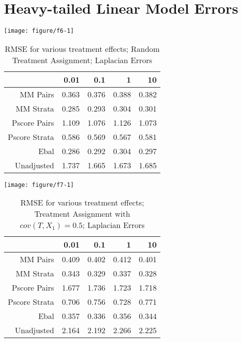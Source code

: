 \documentclass[11pt]{article}\usepackage[]{graphicx}\usepackage[]{color}
\makeatletter
\def\maxwidth{ %
  \ifdim\Gin@nat@width>\linewidth
    \linewidth
  \else
    \Gin@nat@width
  \fi
}
\newenvironment{knitrout}{}{} %
\makeatother
\begin{document}
\section{Heavy-tailed Linear Model Errors}
\begin{knitrout}
\color{fgcolor}

{\centering \texttt{[image: figure/f6-1]} 

}



\end{knitrout}
\begin{table}[ht]
\centering
\begin{tabular}{rrrrr}
  \hline
 & 0.01 & 0.1 & 1 & 10 \\ 
  \hline
MM Pairs & 0.363 & 0.376 & 0.388 & 0.382 \\ 
  MM Strata & 0.285 & 0.293 & 0.304 & 0.301 \\ 
  Pscore Pairs & 1.109 & 1.076 & 1.126 & 1.073 \\ 
  Pscore Strata & 0.586 & 0.569 & 0.567 & 0.581 \\ 
  Ebal & 0.286 & 0.292 & 0.304 & 0.297 \\ 
  Unadjusted & 1.737 & 1.665 & 1.673 & 1.685 \\ 
   \hline
\end{tabular}
\caption{RMSE for various treatment effects; Random Treatment Assignment; Laplacian Errors} 
\label{tab:f6}
\end{table}


\begin{knitrout}
\color{fgcolor}

{\centering \texttt{[image: figure/f7-1]} 

}



\end{knitrout}

\begin{table}[ht]
\centering
\begin{tabular}{rrrrr}
  \hline
 & 0.01 & 0.1 & 1 & 10 \\ 
  \hline
MM Pairs & 0.409 & 0.402 & 0.412 & 0.401 \\ 
  MM Strata & 0.343 & 0.329 & 0.337 & 0.328 \\ 
  Pscore Pairs & 1.677 & 1.736 & 1.723 & 1.718 \\ 
  Pscore Strata & 0.706 & 0.756 & 0.728 & 0.771 \\ 
  Ebal & 0.357 & 0.336 & 0.356 & 0.344 \\ 
  Unadjusted & 2.164 & 2.192 & 2.266 & 2.225 \\ 
   \hline
\end{tabular}
\caption{RMSE for various treatment effects; Treatment Assignment with $cov(T, X_1) = 0.5$; Laplacian Errors} 
\label{tab:f7}
\end{table}
\end{document}
